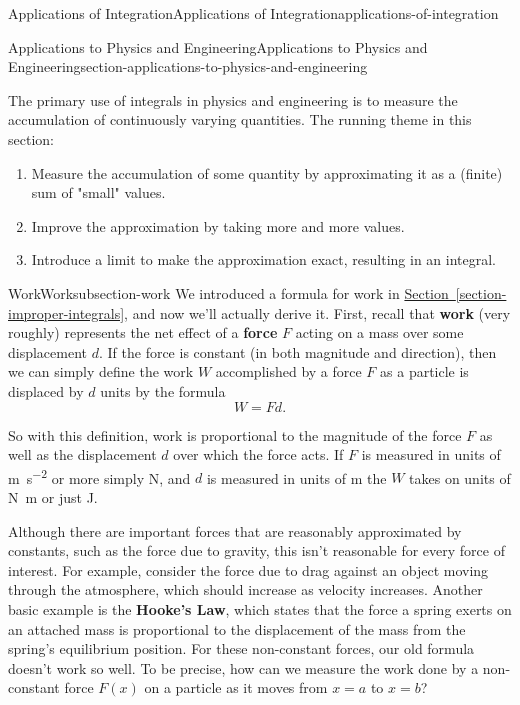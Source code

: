 \documentclass[oneside,10pt,]{book}
\newcommand{\terminology}[1]{\textbf{#1}}
\numberwithin{equation}{section}
\begin{document}
\begin{chapterptx}{Applications of Integration}{}{Applications of Integration}{}{}{applications-of-integration}
\begin{sectionptx}{Applications to Physics and Engineering}{}{Applications to Physics and Engineering}{}{}{section-applications-to-physics-and-engineering}
\begin{introduction}{}%
\hypertarget{p-676}{}%
The primary use of integrals in physics and engineering is to measure the accumulation of continuously varying quantities. The running theme in this section:%
\leavevmode%
\begin{enumerate}
\item\hypertarget{li-52}{}\hypertarget{p-677}{}%
Measure the accumulation of some quantity by approximating it as a (finite) sum of "small" values.%
\item\hypertarget{li-53}{}\hypertarget{p-678}{}%
Improve the approximation by taking more and more values.%
\item\hypertarget{li-54}{}\hypertarget{p-679}{}%
Introduce a limit to make the approximation exact, resulting in an integral.%
\end{enumerate}
\end{introduction}%
%
%
\typeout{************************************************}
\typeout{************************************************}
%
\begin{subsectionptx}{Work}{}{Work}{}{}{subsection-work}
\hypertarget{p-680}{}%
We introduced a formula for work in \hyperref[section-improper-integrals]{Section~\ref{section-improper-integrals}}, and now we'll actually derive it. First, recall that \terminology{work} (very roughly) represents the net effect of a \terminology{force} \(F\) acting on a mass over some displacement \(d\). If the force is constant (in both magnitude and direction), then we can simply define the work \(W\) accomplished by a force \(F\) as a particle is displaced by \(d\) units by the formula%
\begin{equation*}
W = Fd.
\end{equation*}
%
\par
\hypertarget{p-681}{}%
So with this definition, work is proportional to the magnitude of the force \(F\) as well as the displacement \(d\) over which the force acts. If \(F\) is measured in units of \si{\meter\per\second\tothe{2}} or more simply \si{\newton}, and \(d\) is measured in units of \si{\meter} the \(W\) takes on units of \si{\newton\meter} or just \si{\joule}.%
\par
\hypertarget{p-682}{}%
Although there are important forces that are reasonably approximated by constants, such as the force due to gravity, this isn't reasonable for every force of interest. For example, consider the force due to drag against an object moving through the atmosphere, which should increase as velocity increases. Another basic example is the \terminology{Hooke's Law}, which states that the force a spring exerts on an attached mass is proportional to the displacement of the mass from the spring's equilibrium position. For these non-constant forces, our old formula doesn't work so well. To be precise, how can we measure the work done by a non-constant force \(F(x)\) on a particle as it moves from \(x = a\) to \(x = b\)?%

\end{subsectionptx}
\end{sectionptx}
\end{chapterptx}
\end{document}
